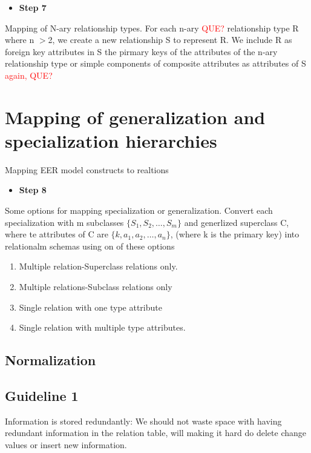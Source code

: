 \begin{itemize}
	\item \textbf{Step 7}
\end{itemize}
Mapping of N-ary relationship types. For each n-ary \textcolor{red}{QUE?} relationship type R where n $>$2, we create a new relationship S to represent R. We include R as foreign key attributes in S the pirmary keys of the attributes of the n-ary relationship type or simple components of composite attributes as attributes of S \textcolor{red}{again, QUE?} 

\section{Mapping of generalization and specialization hierarchies}
Mapping EER model constructs to realtions

\begin{itemize}
	\item \textbf{Step 8}
\end{itemize}
Some options for mapping specialization or generalization. Convert each specialization with m subclasses $\{ S_1, S_2, \ldots, S_m \}$ and generlized superclass C, where te attributes of C are $\{ k, a_1, a_2, \ldots, a_n \}$, (where k is the primary key) into relationalm schemas using on of these options

\begin{enumerate}
 	\item Multiple relation-Superclass relations only. \\


 	\item Multiple relations-Subclass relations only \\

 	
 	\item Single relation with one type attribute \\


 	\item Single relation with multiple type attributes. \\


 \end{enumerate} 



\subsection*{Normalization}
\subsection*{Guideline 1}
Information is stored redundantly: 
We should not waste space with having redundant information in the relation table, will making it hard do delete change values or insert new information. 


